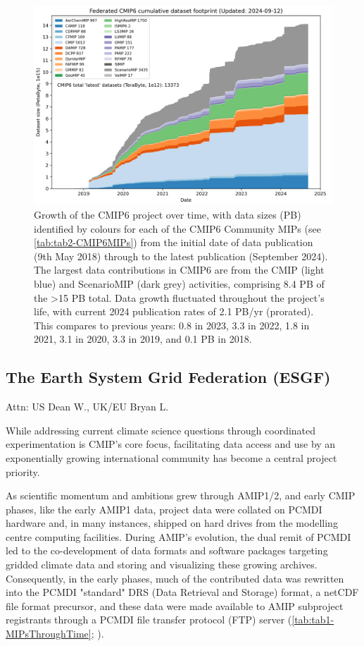 \documentclass[gmd, preprint]{copernicus}
\def\cred#1{{\color{red}#1}}
\begin{document}
\begin{figure}
    \centering
    \includegraphics[width=1\linewidth]{240912T141943_ESGF-PublicationStatsPB.png}
    \caption{Growth of the CMIP6 project over time, with data sizes (PB) identified by colours for each of the CMIP6 Community MIPs (see \autoref{tab:tab2-CMIP6MIPs}) from the initial date of data publication (9th May 2018) through to the latest publication (September 2024). The largest data contributions in CMIP6 are from the CMIP (light blue) and ScenarioMIP (dark grey) activities, comprising 8.4 PB of the >15 PB total. Data growth fluctuated throughout the project's life, with current 2024 publication rates of 2.1 PB/yr (prorated). This compares to previous years: 0.8 in 2023, 3.3 in 2022, 1.8 in 2021, 3.1 in 2020, 3.3 in 2019, and 0.1 PB in 2018.}
    \label{fig:fig2-CMIP6DataGrowth}
\end{figure}


\subsection{The Earth System Grid Federation (ESGF)}
\label{sec:earthSystemGridFederation}
\cred{Attn: US Dean W., UK/EU Bryan L.}

While addressing current climate science questions through coordinated experimentation is CMIP's core focus, facilitating data access and use by an exponentially growing international community has become a central project priority. 

As scientific momentum and ambitions grew through AMIP1/2, and early CMIP phases, like the early AMIP1 data, project data were collated on PCMDI hardware and, in many instances, shipped on hard drives from the modelling centre computing facilities. During AMIP's evolution, the dual remit of PCMDI led to the co-development of data formats and software packages targeting gridded climate data and storing and visualizing these growing archives. Consequently, in the early phases, much of the contributed data was rewritten into the PCMDI "standard" DRS (Data Retrieval and Storage) format, a netCDF file format precursor, and these data were made available to AMIP subproject registrants through a PCMDI file transfer protocol (FTP) server (\autoref{tab:tab1-MIPsThroughTime}; \citet{gates_amip_1995}).
\end{document}
